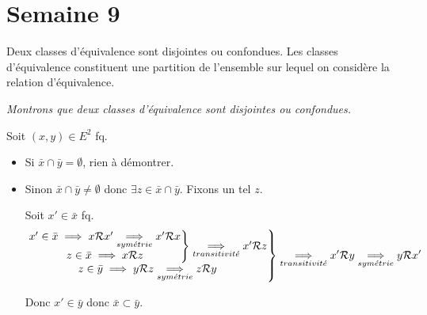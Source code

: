 \documentclass{article}
\renewenvironment{question_kholle}[2][ ]
{
	\subsection{\texorpdfstring{#2}{}}
	\notblank{#1}
	{
		\noindent #1
		\bigbreak
	}
	{}
	\begin{proof}
}
{
	\end{proof}
}
\begin{document}
\pagebreak\section{Semaine 9}

\begin{question_kholle}
  [\noindent Soit \Rel une relation d'équivalence sur $E$. \\
    Soit $x \in E$. \\
    La classe de $x$, notée $\bar{x}$, est l'ensemble des éléments de $E$ en relation avec x.
    \begin{equation}
      \bar{x} = \left\{ y \in E \;|\; x \Rel y \right\}
    \end{equation}]
  {Deux classes d'équivalence sont disjointes ou confondues. Les classes d'équivalence constituent une partition de l'ensemble sur lequel on considère la relation d'équivalence.}

  \textit{Montrons que deux classes d'équivalence sont disjointes ou confondues.}

  Soit $(x, y) \in E^2$ fq.
  \begin{itemize}[label=\textemdash]
    \item Si $\bar{x} \cap \bar{y} = \emptyset$, rien à démontrer.
    \item Sinon $\bar{x} \cap \bar{y} \neq \emptyset$ donc $\exists z \in \bar{x} \cap \bar{y}$. Fixons un tel $z$.

          Soit $x' \in \bar{x}$ fq.
          \begin{equation*}
            \left.
            \begin{matrix}
              \left. \begin{matrix}
                       x' \in \bar{x} \implies x \mathcal R x' \underset{sym\acute{e}trie}{\implies} x' \mathcal R x \\
                       z \in \bar{x} \implies x \mathcal R z
                     \end{matrix}
              \right\} \underset{transitivit\acute{e}}{\implies} x' \mathcal R z \\
              z \in \bar{y} \implies y \mathcal R z \underset{sym\acute{e}trie}{\implies} z \mathcal R y
            \end{matrix}
            \right\} \underset{transitivit\acute{e}}{\implies} x' \mathcal R y
            \underset{sym\acute{e}trie}{\implies} y \mathcal R x'
          \end{equation*}

          Donc $x' \in \bar{y}$ donc $\bar{x} \subset \bar{y}$.


\end{itemize}
\end{question_kholle}
\end{document}
